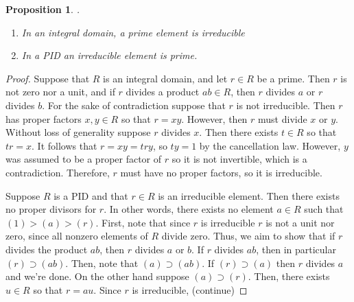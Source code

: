 \documentclass[12pt]{article}
\newtheorem{prop}[thm]{Proposition}
\theoremstyle{definition}
\theoremstyle{remark}
\numberwithin{equation}{section}
\begin{document}
\begin{prop}
        .\newline\begin{enumerate}
                \item In an integral domain, a prime element is irreducible 
                \item In a PID an irreducible element is prime.
        \end{enumerate}
\end{prop}
\begin{proof}
        Suppose that $R$ is an integral domain, and let $r \in R$ be a prime. Then $r$ is not zero nor a unit, and if $r$ divides a product $ab \in R$, then $r$ divides $a$ or $r$ divides $b$. For the sake of contradiction suppose that $r$ is not irreducible. Then $r$ has proper factors $x,y \in R$ so that $r = xy$. However, then $r$ must divide $x$ or $y$. Without loss of generality suppose $r$ divides $x$. Then there exists $t \in R$ so that $tr = x$. It follows that $r = xy = try$, so $ty =1$ by the cancellation law. However, $y$ was assumed to be a proper factor of $r$ so it is not invertible, which is a contradiction. Therefore, $r$ must have no proper factors, so it is irreducible.

        Suppose $R$ is a PID and that $r \in R$ is an irreducible element. Then there exists no proper divisors for $r$. In other words, there exists no element $a \in R$ such that $(1) > (a) > (r)$. First, note that since $r$ is irreducible $r$ is not a unit nor zero, since all nonzero elements of $R$ divide zero. Thus, we aim to show that if $r$ divides the product $ab$, then $r$ divides $a$ or $b$. If $r$ divides $ab$, then in particular $(r) \supset (ab)$. Then, note that $(a) \supset (ab)$. If $(r) \supset (a)$ then $r$ divides $a$ and we're done. On the other hand suppose $(a) \supset (r)$. Then, there exists $u \in R$ so that $r = au$. Since $r$ is irreducible, (continue)
\end{proof}

\vspace{15pt}
\end{document}
